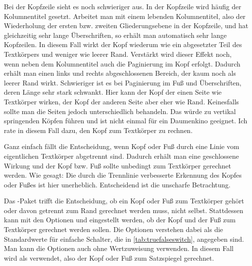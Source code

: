 \begin{Explain}
  Bei der Kopfzeile sieht es noch schwieriger aus. In der Kopfzeile wird
  häufig der Kolumnentitel
  \iffalse%
  \unskip\footnote{Unter dem Kolumnentitel versteht man in der Regel die
    Wiederholung einer Überschrift mit Titelcharakter. Er steht häufig im
    Seitenkopf, seltener im Seitenfuß.} %
  \fi gesetzt. Arbeitet man mit einem lebenden Kolumnentitel, also der
  Wiederholung der ersten bzw.  zweiten Gliederungsebene in der Kopfzeile, und
  hat gleichzeitig sehr lange Überschriften, so erhält man automatisch sehr
  lange Kopfzeilen. In diesem Fall wirkt der Kopf wiederum wie ein abgesetzter
  Teil des Textkörpers und weniger wie leerer Rand.  Verstärkt wird dieser
  Effekt noch, wenn neben dem Kolumnentitel auch die Paginierung im Kopf
  erfolgt. Dadurch erhält man einen links und rechts abgeschlossenen Bereich,
  der kaum noch als leerer Rand wirkt.  Schwieriger ist es bei Paginierung im
  Fuß und Überschriften, deren Länge sehr stark schwankt. Hier kann der Kopf
  der einen Seite wie Textkörper wirken, der Kopf der anderen Seite aber
  eher wie Rand.  Keinesfalls sollte man die Seiten jedoch unterschiedlich
  behandeln.  Das würde zu vertikal springenden Köpfen führen und ist nicht
  einmal für ein Daumenkino geeignet. Ich rate in diesem Fall dazu, den Kopf
  zum Textkörper zu rechnen.

  Ganz einfach fällt die Entscheidung, wenn Kopf oder Fuß durch
  eine Linie vom eigentlichen Textkörper abgetrennt sind. Dadurch
  erhält man eine geschlossene Wirkung und der Kopf bzw. Fuß sollte
  unbedingt zum Textkörper gerechnet werden. Wie gesagt: Die durch die
  Trennlinie verbesserte Erkennung des Kopfes oder Fußes ist hier
  unerheblich. Entscheidend ist die unscharfe Betrachtung.\par
\end{Explain}

Das -Paket trifft die Entscheidung, ob ein Kopf oder Fuß zum
Textkörper gehört oder davon getrennt zum Rand gerechnet
werden muss, nicht selbst. Stattdessen kann mit den Optionen
 und  eingestellt werden, ob der Kopf
und der Fuß zum Textkörper gerechnet werden sollen. Die Optionen verstehen
dabei als  die
Standardwerte für einfache Schalter, die in \autoref{tab:truefalseswitch},
 angegeben sind. Man kann die Optionen auch
ohne Wertzuweisung verwenden. In diesem Fall wird  als
 verwendet, also der Kopf oder Fuß zum Satzspiegel
gerechnet.

